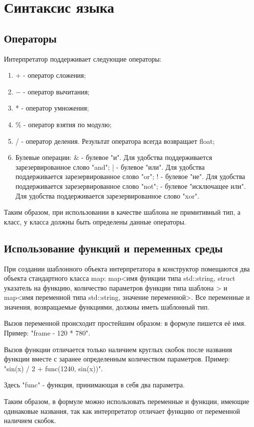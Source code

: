 \documentclass[../Language-declaration.tex]{subfiles}
\begin{document}
    \chapter{Синтаксис языка}
        \section{Операторы}
            Интерпретатор поддерживает следующие операторы:
        \begin{enumerate}
         \item + - оператор сложения;
         \item $-$ - оператор вычитания;
         \item * - оператор умножения;
         \item \% - оператор взятия по модулю;
         \item / - оператор деления. Результат оператора всегда возвращает float;
         \item Булевые операции:
            \subitem \& - булевое "и". Для удобства поддерживается зарезервированное слово "and";
            \subitem | - булевое "или". Для удобства поддерживается зарезервированное слово "or";
            \subitem ! - булевое "не". Для удобства поддерживается зарезервированное слово "not";
            \subitem  - булевое "исключащее или".  Для удобства поддерживается зарезервированное слово "xor".
        \end{enumerate}
        Таким образом, при использовании в качестве шаблона не примитивный тип, а класс, у класса должны быть определены данные операторы.

        \section{Использование функций и переменных среды}
            При создании шаблонного объекта интерпретатора в конструктор помещаются два объекта стандартного класса map: map<имя функции типа std::string, struct { указатель на функцию, количество параметров функции типа шаблона }> и map<имя переменной типа std::string, значение переменной>. Все переменные и значения, возвращаемые функциями, должны иметь шаблонный тип.

            Вызов переменной происходит простейшим образом: в формуле пишется её имя.
            Пример: "frame - 120 * 780".

            Вызов функции отличается только наличием круглых скобок после названия функции вместе с заранее определенным количеством параметров.
            Пример: "sin(x) / 2 + func(1240, sin(x))".

            Здесь "func" - функция, принимающая в себя два параметра.

            Таким образом, в формуле можно использовать переменные и функции, имеющие одинаковые названия, так как интерпретатор отличает функцию от переменной наличием скобок.
\end{document}
